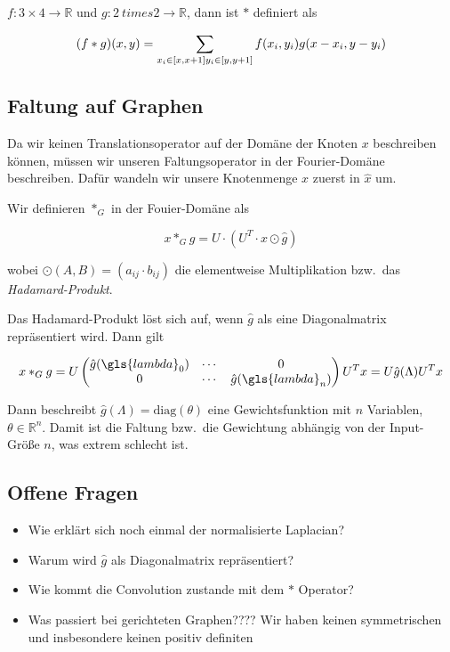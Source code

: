 $f: 3 \times 4 \rightarrow \mathbb{R}$ und $g: 2 \ times 2 \rightarrow \mathbb{R}$, dann ist $*$ definiert als

\begin{equation}
  (f * g)(x, y) = \sum_{x_i \in [x, x+1]\\y_i \in [y, y+1]} f(x_i, y_i)g(x-x_i, y-y_i)
\end{equation}

\subsection{Faltung auf Graphen}

Da wir keinen Translationsoperator auf der Domäne der Knoten $x$ beschreiben können, müssen wir unseren Faltungsoperator in der Fourier-Domäne beschreiben.
Dafür wandeln wir unsere Knotenmenge $x$ zuerst in $\hat x$ um.

Wir definieren $*_G$ in der Fouier-Domäne als

\begin{equation}
  x *_G g = U \cdot (U^T \cdot x \odot \hat g)
\end{equation}

wobei $\odot(A, B) = (a_{ij} \cdot b_{ij})$ die elementweise Multiplikation bzw.\ das \emph{Hadamard-Produkt}.

Das Hadamard-Produkt löst sich auf, wenn $\hat g$ als eine Diagonalmatrix repräsentiert wird. Dann gilt

\begin{equation}
  x *_G g = U \begin{pmatrix}
    \hat g(\gls{lambda}_0) & \cdots & 0\\
    0 & \cdots & \hat g(\gls{lambda}_n)
  \end{pmatrix}U^T x = U \hat g(\Lambda) U^T x
\end{equation}

Dann beschreibt $\hat g(\Lambda) = \text{diag}(\theta)$ eine Gewichtsfunktion mit $n$ Variablen, $\theta \in \mathbb{R}^n$.
Damit ist die Faltung bzw.\ die Gewichtung abhängig von der Input-Größe $n$, was extrem schlecht ist.

\subsection{Offene Fragen}

\begin{itemize}
  \item Wie erklärt sich noch einmal der normalisierte Laplacian?
  \item Warum wird $\hat g$ als Diagonalmatrix repräsentiert?
  \item Wie kommt die Convolution zustande mit dem $*$ Operator?
  \item Was passiert bei gerichteten Graphen???? Wir haben keinen symmetrischen und insbesondere keinen positiv definiten
\end{itemize}

